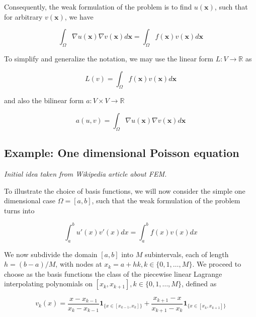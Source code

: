 \documentclass[11pt, a4paper]{article}
\begin{document}
Consequently, the weak formulation of the problem is to find $u(\mathbf{x})$, such
that for arbitrary $v(\mathbf{x})$, we have

\begin{equation}
    \int_{\Omega} \nabla u(\mathbf{x}) \nabla v(\mathbf{x}) d\mathbf{x} = \int_{\Omega} f(\mathbf{x}) v(\mathbf{x}) d\mathbf{x}
\end{equation}

To simplify and generalize the notation, we may use the linear form $L:V \to \mathbb{R}$ as 

\begin{equation}
    L(v) = \int_{\Omega} f(\mathbf{x}) v(\mathbf{x}) d\mathbf{x}
\end{equation}

and also the bilinear form $a: V \times V \to \mathbb{R}$

\begin{equation}
    a(u, v) = \int_{\Omega} \nabla u(\mathbf{x}) \nabla v(\mathbf{x}) d\mathbf{x}
\end{equation}

\subsection{Example: One dimensional Poisson equation}
\label{subsec:1dpoiss}

\textit{Initial idea taken from Wikipedia article about FEM.}

To illustrate the choice of basis functions, we will now consider the simple one 
dimensional case $\Omega = [a, b]$, such that the weak formulation of the problem
turns into 

\begin{equation}
    \int_a^b u'(x) v'(x) dx = \int_a^b f(x) v(x) dx
\end{equation}

We now subdivide the domain $[a, b]$ into $M$ subintervals, each of length
$h=(b - a)/M$, with nodes at $x_k = a + hk, k \in \{0, 1, \dots, M\}$. We
proceed to choose as the basis functions the class of the piecewise linear
Lagrange interpolating polynomials on $[x_k, x_{k+1}], k \in \{0, 1, \dots, M\}$,
defined as 

\begin{equation}
    v_k(x) = \frac{x-x_{k-1}}{x_{k}-x_{k-1}} \mathbf{1}_{\{x \in [x_{k-1}, x_k]\}} + 
            \frac{x_{k+1}-x}{x_{k+1}-x_k} \mathbf{1}_{\{x \in [x_k, x_{k+1}]\}}
\end{equation}
\end{document}
